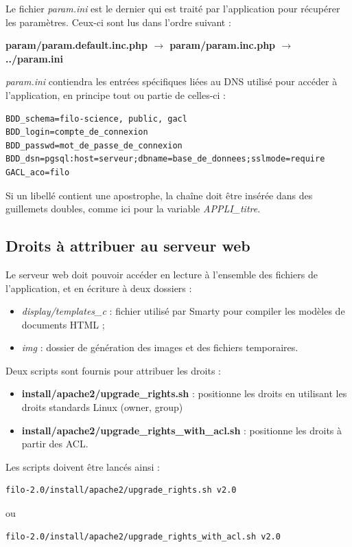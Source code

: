Le fichier \textit{param.ini} est le dernier qui est traité par l'application pour récupérer les paramètres. Ceux-ci sont lus dans l'ordre suivant :

\textbf{param/param.default.inc.php $\rightarrow$ param/param.inc.php $\rightarrow$ ../param.ini}

\textit{param.ini} contiendra les entrées spécifiques liées au DNS utilisé pour accéder à l'application, en principe tout ou partie de celles-ci :
\begin{lstlisting}
BDD_schema=filo-science, public, gacl
BDD_login=compte_de_connexion
BDD_passwd=mot_de_passe_de_connexion
BDD_dsn=pgsql:host=serveur;dbname=base_de_donnees;sslmode=require
GACL_aco=filo
\end{lstlisting}

Si un libellé contient une apostrophe, la chaîne doit être insérée dans des guillemets doubles, comme ici pour la variable \textit{APPLI\_titre}.


\subsection{Droits à attribuer au serveur web}
\label{droitsApache}
Le serveur web doit pouvoir accéder en lecture à l'ensemble des fichiers de l'application, et en écriture à deux dossiers :
\begin{itemize}
\item \textit{display/templates\_c} : fichier utilisé par Smarty pour compiler les modèles de documents HTML ;
\item \textit{img} : dossier de génération des images et des fichiers temporaires.
\end{itemize}

Deux scripts sont fournis pour attribuer les droits : 
\begin{itemize}
\item \textbf{install/apache2/upgrade\_rights.sh} : positionne les droits en utilisant les droits standards Linux (owner, group)
\item \textbf{install/apache2/upgrade\_rights\_with\_acl.sh} : positionne les droits à partir des ACL.
\end{itemize}

Les scripts doivent être lancés ainsi :
\begin{lstlisting}
filo-2.0/install/apache2/upgrade_rights.sh v2.0
\end{lstlisting}
ou 
\begin{lstlisting}
filo-2.0/install/apache2/upgrade_rights_with_acl.sh v2.0
\end{lstlisting}


